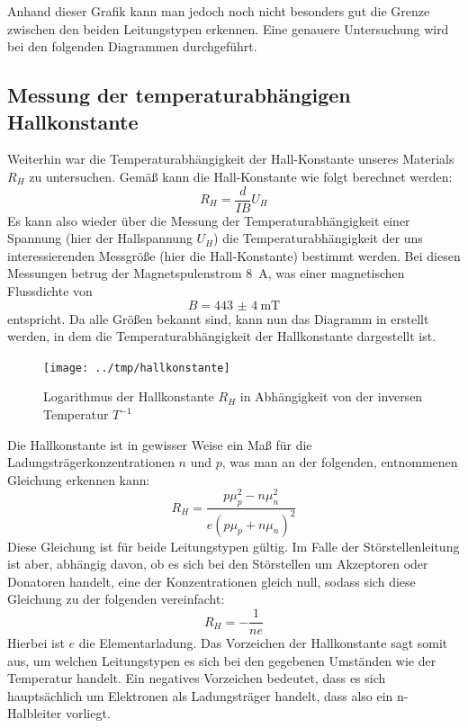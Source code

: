Anhand dieser Grafik kann man jedoch noch nicht besonders gut die Grenze
zwischen den beiden Leitungstypen erkennen. Eine genauere
Untersuchung wird bei den folgenden Diagrammen durchgeführt.

\subsection{Messung der temperaturabhängigen Hallkonstante}

Weiterhin war die Temperaturabhängigkeit der Hall-Konstante unseres Materials
$R_H$ zu untersuchen. Gemäß \cite[Gl. (XIV.2)]{ibach} kann die Hall-Konstante
wie folgt berechnet werden: 
\begin{equation}
R_H = \frac{d}{I B} U_H
\end{equation}
Es kann also wieder über die Messung der Temperaturabhängigkeit einer Spannung
(hier der Hallspannung $U_H$) die Temperaturabhängigkeit der uns
interessierenden Messgröße (hier die Hall-Konstante) bestimmt werden. Bei
diesen Messungen betrug der Magnetspulenstrom \SI{8}{\ampere}, was einer
magnetischen Flussdichte von
\begin{equation}
 B=\SI{443(4)}{\milli\tesla}
\end{equation}
entspricht.
Da alle Größen bekannt sind, kann nun das Diagramm in 
erstellt werden, in dem die Temperaturabhängigkeit der Hallkonstante dargestellt ist.
\begin{figure}[htb]
   \centering
   \texttt{[image: ../tmp/hallkonstante]}
   \caption{Logarithmus der Hallkonstante $R_H$ in Abhängigkeit von der inversen Temperatur $T^{-1}$}
   \label{fig:hallkonstante}
\end{figure}

Die Hallkonstante ist in gewisser Weise ein Maß für die
Ladungsträgerkonzentrationen $n$ und $p$, was man an der folgenden, \cite[Gl.
XIV.5]{ibach} entnommenen Gleichung erkennen kann:
\begin{equation}
R_H = \frac{pμ_p^2-nμ_n^2}{e(pμ_p+nμ_n)^2}
\end{equation}
Diese Gleichung ist für beide Leitungstypen gültig. Im Falle der
Störstellenleitung ist aber, abhängig davon, ob es sich bei den Störstellen um
Akzeptoren oder Donatoren handelt, eine der Konzentrationen gleich null, sodass
sich diese Gleichung zu der folgenden vereinfacht:
\begin{equation}
\label{eqn:hallkonst}
R_H = -\frac{1}{ne}
\end{equation}
Hierbei ist $e$ die Elementarladung. Das Vorzeichen der Hallkonstante sagt
somit aus, um welchen Leitungstypen es sich bei den gegebenen Umständen wie
der Temperatur handelt. Ein negatives Vorzeichen bedeutet, dass es sich
hauptsächlich um Elektronen als Ladungsträger handelt, dass also ein
n-Halbleiter vorliegt.

